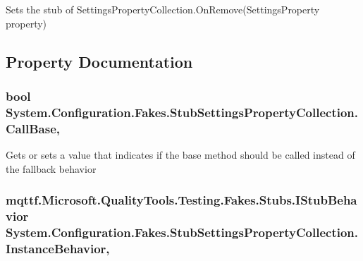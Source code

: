 Sets the stub of Settings\-Property\-Collection.\-On\-Remove(\-Settings\-Property property)



\subsection{Property Documentation}
\hypertarget{class_system_1_1_configuration_1_1_fakes_1_1_stub_settings_property_collection_a43f23ec879172865990eb6c5e7103f2b}{
\subsubsection[{Call\-Base}]{\setlength{\rightskip}{0pt plus 5cm}bool System.\-Configuration.\-Fakes.\-Stub\-Settings\-Property\-Collection.\-Call\-Base\hspace{0.3cm}{\ttfamily [get]}, {\ttfamily [set]}}}\label{class_system_1_1_configuration_1_1_fakes_1_1_stub_settings_property_collection_a43f23ec879172865990eb6c5e7103f2b}


Gets or sets a value that indicates if the base method should be called instead of the fallback behavior

\hypertarget{class_system_1_1_configuration_1_1_fakes_1_1_stub_settings_property_collection_a91fbbe75db27b3a996ef3369e6af68f6}{
\subsubsection[{Instance\-Behavior}]{\setlength{\rightskip}{0pt plus 5cm}mqttf.\-Microsoft.\-Quality\-Tools.\-Testing.\-Fakes.\-Stubs.\-I\-Stub\-Behavior System.\-Configuration.\-Fakes.\-Stub\-Settings\-Property\-Collection.\-Instance\-Behavior\hspace{0.3cm}{\ttfamily [get]}, {\ttfamily [set]}}}\label{class_system_1_1_configuration_1_1_fakes_1_1_stub_settings_property_collection_a91fbbe75db27b3a996ef3369e6af68f6}


